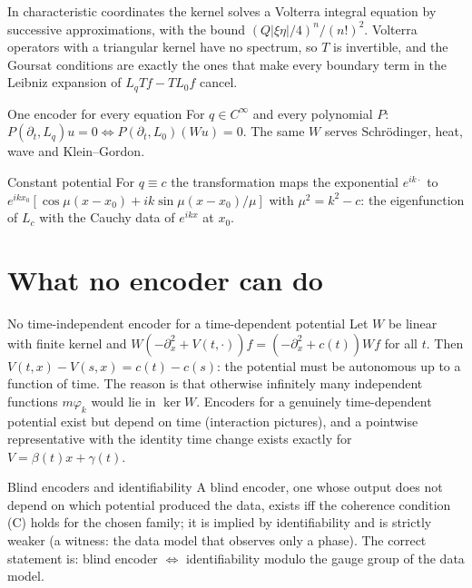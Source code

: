 \begin{intuition}
In characteristic coordinates the kernel solves a Volterra integral equation by successive approximations, with the bound $(Q|\xi\eta|/4)^n/(n!)^2$. Volterra operators with a triangular kernel have no spectrum, so $T$ is invertible, and the Goursat conditions are exactly the ones that make every boundary term in the Leibniz expansion of $L_qTf-TL_0f$ cancel.
\end{intuition}

\begin{corollary}{One encoder for every equation  \proved}\label{cor:encc1}
For $q\in C^\infty$ and every polynomial $P$: $P(\partial_t,L_q)u=0\iff P(\partial_t,L_0)(Wu)=0$. The same $W$ serves Schr\"odinger, heat, wave and Klein--Gordon.
\end{corollary}

\begin{example}{Constant potential}
For $q\equiv c$ the transformation maps the exponential $e^{ik\cdot}$ to $e^{ikx_0}[\cos\mu(x-x_0)+ik\sin\mu(x-x_0)/\mu]$ with $\mu^2=k^2-c$: the eigenfunction of $L_c$ with the Cauchy data of $e^{ikx}$ at $x_0$.
\end{example}

\section{What no encoder can do}

\begin{theorem}{No time-independent encoder for a time-dependent potential  \pw}\label{thm:encp0}
Let $W$ be linear with finite kernel and $W(-\partial_x^2+V(t,\cdot))f=(-\partial_x^2+c(t))Wf$ for all $t$. Then $V(t,x)-V(s,x)=c(t)-c(s)$: the potential must be autonomous up to a function of time. The reason is that otherwise infinitely many independent functions $m\varphi_k$ would lie in $\ker W$. Encoders for a genuinely time-dependent potential exist but depend on time (interaction pictures), and a pointwise representative with the identity time change exists exactly for $V=\beta(t)x+\gamma(t)$.
\end{theorem}

\begin{theorem}{Blind encoders and identifiability  \proved}\label{lem:encn1}
A blind encoder, one whose output does not depend on which potential produced the data, exists iff the coherence condition (C) holds for the chosen family; it is implied by identifiability and is strictly weaker (a witness: the data model that observes only a phase). The correct statement is: blind encoder $\iff$ identifiability modulo the gauge group of the data model.
\end{theorem}

